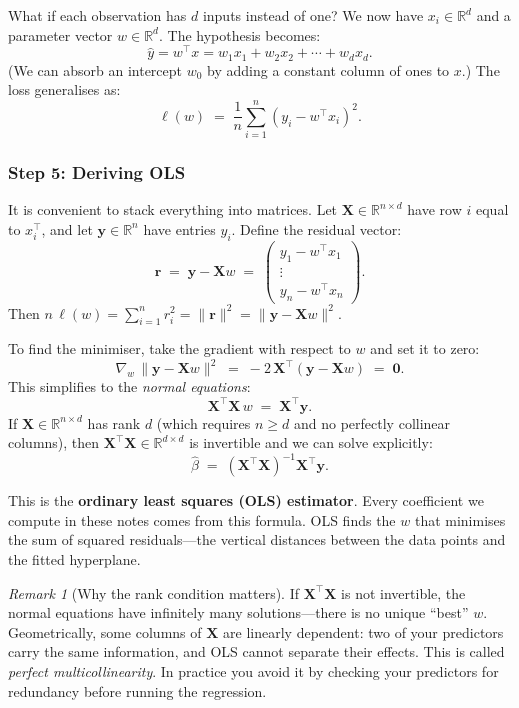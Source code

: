 \documentclass[11pt,a4paper]{article}
\theoremstyle{definition}
\theoremstyle{plain}
\theoremstyle{remark}
\newtheorem{remark}{Remark}[section]
\newcommand{\bhat}{\hat{\beta}}
\begin{document}
What if each observation has $d$ inputs instead of one? We now have $x_i \in \mathbb{R}^d$ and a parameter vector $w \in \mathbb{R}^d$. The hypothesis becomes:
\[
  \hat{y} = w^\top x = w_1 x_1 + w_2 x_2 + \cdots + w_d x_d.
\]
(We can absorb an intercept $w_0$ by adding a constant column of ones to $x$.) The loss generalises as:
\[
  \ell(w) \;=\; \frac{1}{n} \sum_{i=1}^{n} (y_i - w^\top x_i)^2.
\]

\subsubsection*{Step 5: Deriving OLS}

It is convenient to stack everything into matrices. Let $\mathbf{X} \in \mathbb{R}^{n \times d}$ have row $i$ equal to $x_i^\top$, and let $\mathbf{y} \in \mathbb{R}^n$ have entries $y_i$. Define the residual vector:
\[
  \mathbf{r} \;=\; \mathbf{y} - \mathbf{X} w
  \;=\; \begin{pmatrix} y_1 - w^\top x_1 \\ \vdots \\ y_n - w^\top x_n \end{pmatrix}.
\]
Then $n\, \ell(w) = \sum_{i=1}^n r_i^2 = \|\mathbf{r}\|^2 = \|\mathbf{y} - \mathbf{X} w\|^2$.

To find the minimiser, take the gradient with respect to $w$ and set it to zero:
\[
  \nabla_w \, \|\mathbf{y} - \mathbf{X} w\|^2 \;=\; -2\, \mathbf{X}^\top (\mathbf{y} - \mathbf{X} w) \;=\; \mathbf{0}.
\]
This simplifies to the \emph{normal equations}:
\[
  \mathbf{X}^\top \mathbf{X}\, w \;=\; \mathbf{X}^\top \mathbf{y}.
\]
If $\mathbf{X} \in \mathbb{R}^{n \times d}$ has rank $d$ (which requires $n \ge d$ and no perfectly collinear columns), then $\mathbf{X}^\top \mathbf{X} \in \mathbb{R}^{d \times d}$ is invertible and we can solve explicitly:
\begin{equation}\label{eq:ols}
  \boxed{\;\bhat \;=\; (\mathbf{X}^\top \mathbf{X})^{-1} \mathbf{X}^\top \mathbf{y}.\;}
\end{equation}

This is the \textbf{ordinary least squares (OLS) estimator}. Every coefficient we compute in these notes comes from this formula. OLS finds the $w$ that minimises the sum of squared residuals---the vertical distances between the data points and the fitted hyperplane.

\begin{remark}[Why the rank condition matters]
If $\mathbf{X}^\top \mathbf{X}$ is not invertible, the normal equations have infinitely many solutions---there is no unique ``best'' $w$. Geometrically, some columns of $\mathbf{X}$ are linearly dependent: two of your predictors carry the same information, and OLS cannot separate their effects. This is called \emph{perfect multicollinearity}. In practice you avoid it by checking your predictors for redundancy before running the regression.
\end{remark}
\end{document}
